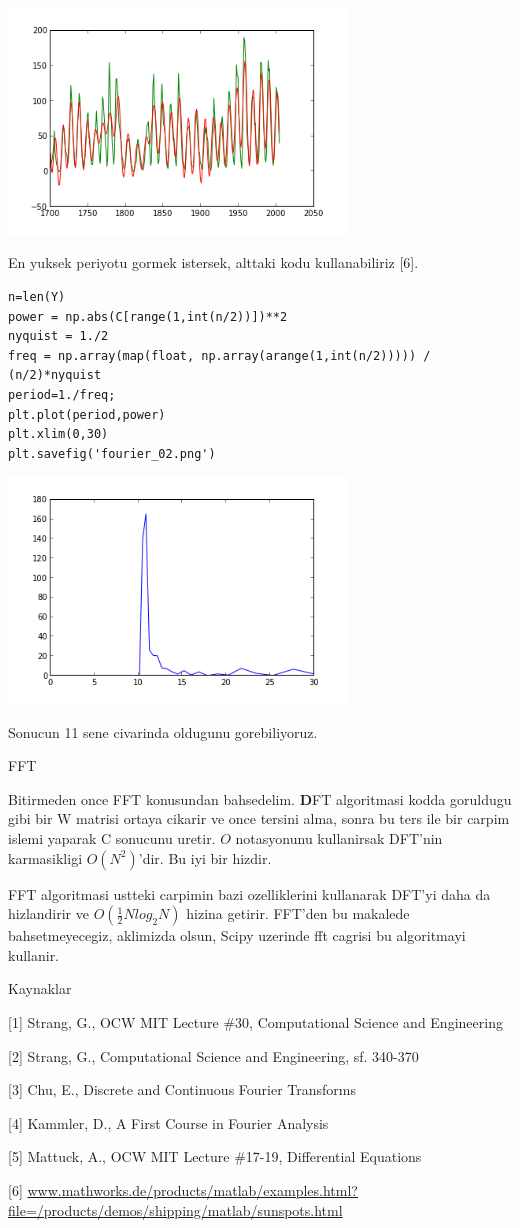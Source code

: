 \documentclass[12pt,fleqn]{article}\usepackage{../common}
\begin{document}
\includegraphics[height=6cm]{fourier_1.png}

En yuksek periyotu gormek istersek, alttaki kodu kullanabiliriz [6].

\begin{verbatim}
n=len(Y)
power = np.abs(C[range(1,int(n/2))])**2
nyquist = 1./2
freq = np.array(map(float, np.array(arange(1,int(n/2))))) / (n/2)*nyquist
period=1./freq;
plt.plot(period,power)
plt.xlim(0,30)
plt.savefig('fourier_02.png')
\end{verbatim}

\includegraphics[height=6cm]{fourier_02.png}


Sonucun 11 sene civarinda oldugunu gorebiliyoruz. 

FFT

Bitirmeden once FFT konusundan bahsedelim. $\textbf{D}$FT algoritmasi
kodda goruldugu gibi bir W matrisi ortaya cikarir ve once tersini
alma, sonra bu ters ile bir carpim islemi yaparak C sonucunu
uretir. $O$ notasyonunu kullanirsak DFT'nin karmasikligi
$O(N^2)$'dir. Bu iyi bir hizdir.

FFT algoritmasi ustteki carpimin bazi ozelliklerini kullanarak DFT'yi
daha da hizlandirir ve $O(\frac{1}{2}Nlog_2N)$ hizina getirir. FFT'den
bu makalede bahsetmeyecegiz, aklimizda olsun, Scipy uzerinde fft
cagrisi bu algoritmayi kullanir.

Kaynaklar

[1] Strang, G., OCW MIT Lecture \#30, Computational Science and Engineering

[2] Strang, G., Computational Science and Engineering, sf. 340-370

[3] Chu, E., Discrete and Continuous Fourier Transforms

[4] Kammler, D., A First Course in Fourier Analysis

[5] Mattuck, A., OCW MIT Lecture \#17-19, Differential Equations

[6] \url{www.mathworks.de/products/matlab/examples.html?file=/products/demos/shipping/matlab/sunspots.html}
\end{document}
